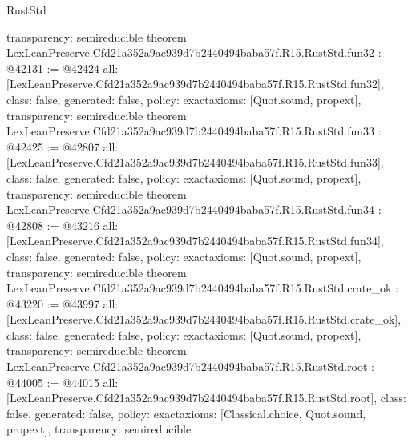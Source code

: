 \begin{lexlean}{RustStd}
\begin{coremodule}
{  transparency: semireducible
}
theorem LexLeanPreserve.Cfd21a352a9ac939d7b2440494baba57f.R15.RustStd.fun32 : @42131 := @42424 {
  all: [LexLeanPreserve.Cfd21a352a9ac939d7b2440494baba57f.R15.RustStd.fun32],
  class: false,
  generated: false,
  policy: exact{axioms: [Quot.sound, propext]},
  transparency: semireducible
}
theorem LexLeanPreserve.Cfd21a352a9ac939d7b2440494baba57f.R15.RustStd.fun33 : @42425 := @42807 {
  all: [LexLeanPreserve.Cfd21a352a9ac939d7b2440494baba57f.R15.RustStd.fun33],
  class: false,
  generated: false,
  policy: exact{axioms: [Quot.sound, propext]},
  transparency: semireducible
}
theorem LexLeanPreserve.Cfd21a352a9ac939d7b2440494baba57f.R15.RustStd.fun34 : @42808 := @43216 {
  all: [LexLeanPreserve.Cfd21a352a9ac939d7b2440494baba57f.R15.RustStd.fun34],
  class: false,
  generated: false,
  policy: exact{axioms: [Quot.sound, propext]},
  transparency: semireducible
}
theorem LexLeanPreserve.Cfd21a352a9ac939d7b2440494baba57f.R15.RustStd.crate_ok : @43220 := @43997 {
  all: [LexLeanPreserve.Cfd21a352a9ac939d7b2440494baba57f.R15.RustStd.crate_ok],
  class: false,
  generated: false,
  policy: exact{axioms: [Quot.sound, propext]},
  transparency: semireducible
}
theorem LexLeanPreserve.Cfd21a352a9ac939d7b2440494baba57f.R15.RustStd.root : @44005 := @44015 {
  all: [LexLeanPreserve.Cfd21a352a9ac939d7b2440494baba57f.R15.RustStd.root],
  class: false,
  generated: false,
  policy: exact{axioms: [Classical.choice, Quot.sound, propext]},
  transparency: semireducible
}


\end{coremodule}
\end{lexlean}
